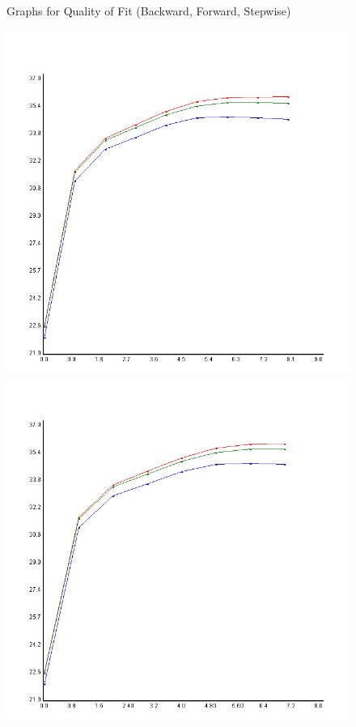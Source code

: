 \documentclass{article}
\begin{document}
	\begin{figure}
	\begin{center}


		\caption \newline Graphs for Quality of Fit (Backward, Forward, Stepwise)
		
		
		\includegraphics[scale=0.25]{../plots/Wine/Scala/MultipleLinearRegressionForwardSel.png}
		\includegraphics[scale=0.25]{../plots/Wine/Scala/MultipleLinearRegressionBackElim.png}
		

\end{center}
\end{figure}
\end{document}
